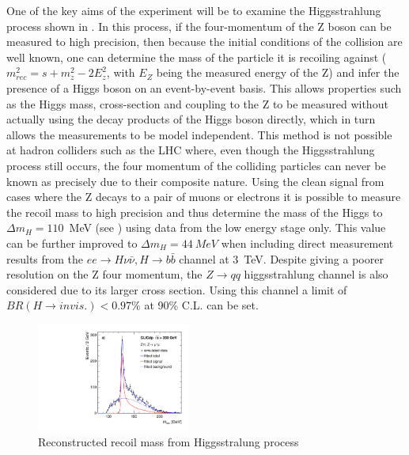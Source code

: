 One of the key aims of the experiment will be to examine the Higgsstrahlung process shown in . In this process, if the four-momentum of the Z boson can be measured to high precision, then because the initial conditions of the collision are well known, one can determine the mass of the particle it is recoiling against ($m_{rec}^{2} = s + m_{z}^{2} - 2E_{z}^{2}$, with $E_Z$ being the measured energy of the Z) and infer the presence of a Higgs boson on an event-by-event basis. This allows properties such as the Higgs mass, cross-section and coupling to the Z to be measured without actually using the decay products of the Higgs boson directly, which in turn allows the measurements to be model independent. This method is not possible at hadron colliders such as the LHC where, even though the Higgsstrahlung process still occurs, the four momentum of the colliding particles can never be known as precisely due to their composite nature. Using the clean signal from cases where the Z decays to a pair of muons or electrons it is possible to measure the recoil mass to high precision and thus determine the mass of the Higgs to $\Delta m_{H} = 110$~MeV (see ) using data from the low energy stage only. This value can be further improved to $\Delta m_{H} = 44~MeV$ when including direct measurement results from the $ee\rightarrow H\nu\bar{\nu}, H\rightarrow b\bar{b}$ channel at 3~TeV. Despite giving a poorer resolution on the Z four momentum, the $Z\rightarrow qq$ higgsstrahlung channel is also considered due to its larger cross section. Using this channel a limit of $BR(H\rightarrow invis.) <0.97\%$ at 90\% C.L. can be set. 

\begin{figure}
  \centering
  \includegraphics[width=0.45\textwidth,keepaspectratio]{Theory/fig/350GeV_Recoil_mumuX_MrecoilFit.pdf}
  \caption[Reconstructed recoil mass from Higgsstralung process]{Reconstructed recoil mass from Higgsstralung process \cite{Abramowicz:2016zbo}}
  \label{fig:higgsmass}
\end{figure}

